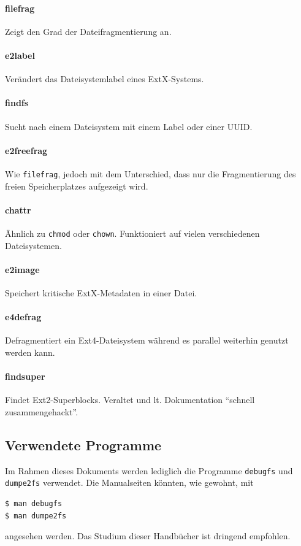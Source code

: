 \documentclass[11pt,a4paper]{article}
\def\inlinebash{\lstinline[style=bash]}
\begin{document}
\paragraph{filefrag}
	Zeigt den Grad der Dateifragmentierung an.

\paragraph{e2label}
	Verändert das Dateisystemlabel eines ExtX-Systems.

\paragraph{findfs}
	Sucht nach einem Dateisystem mit einem Label oder einer UUID.

\paragraph{e2freefrag}
	Wie \inlinebash$filefrag$, jedoch mit dem Unterschied, dass nur die Fragmentierung
	des freien Speicherplatzes aufgezeigt wird.

\paragraph{chattr}
	Ähnlich zu \inlinebash$chmod$ oder \inlinebash$chown$. Funktioniert auf vielen verschiedenen Dateisystemen. 

\paragraph{e2image}
	Speichert kritische ExtX-Metadaten in einer Datei. 

\paragraph{e4defrag}
	Defragmentiert ein Ext4-Dateisystem während es parallel
	weiterhin genutzt werden kann.

\paragraph{findsuper}
	Findet Ext2-Superblocks. Veraltet und lt. Dokumentation ``schnell zusammengehackt''.

\subsection{Verwendete Programme}
Im Rahmen dieses Dokuments werden lediglich die Programme \inlinebash$debugfs$
und \inlinebash$dumpe2fs$ verwendet. Die Manualseiten könnten, wie gewohnt, mit
\begin{lstlisting}[style=bash]
$ man debugfs
$ man dumpe2fs
\end{lstlisting}
angesehen werden. Das Studium dieser Handbücher ist dringend empfohlen.
\end{document}
